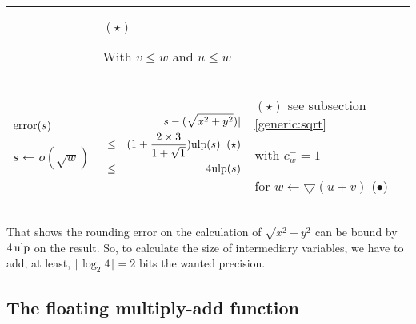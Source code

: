 \documentclass[12pt]{amsart}
\def\minf{\bigtriangledown}
\def\ulp{{\rm ulp}}
\begin{document}
\begin{center}
\begin{tabular}{l l l}
\begin{minipage}{7.8cm}
\end{minipage} &
\begin{minipage}{6cm}

$(\star)$

With $v \leq w$ and $u \leq w$

\end{minipage}\\%
\begin{minipage}{2.5cm}
${\textnormal{error}}(s)$

$s \leftarrow o(\sqrt{w}) $

\end{minipage} &
\begin{minipage}{7.5cm}

\begin{center}



\begin{eqnarray}\nonumber
  &&|s-(\sqrt{x^2+y^2})| \\\nonumber
  &\leq& (1+\frac{2 \times  3}{1+\sqrt{1}}) \ulp(s) \;\; (\star)\\\nonumber
   &\leq& 4 \ulp(s) 
\end{eqnarray}



\end{center}

\end{minipage} &
\begin{minipage}{6cm}

$(\star)$
see subsection \ref{generic:sqrt}

with $c_w^- = 1$ 

for $w \leftarrow \minf(u+v)$ ($\bullet$)

\end{minipage}


\end{tabular}
\end{center}



That shows the rounding error on the calculation of $\sqrt{x^2+y^2}$ can be
bound by $4 \, \ulp$ on the result. So, to calculate the size of
intermediary variables, we have to add, at least, $\lceil \log_2 4 \rceil=2$ bits the wanted precision.


\subsection{The floating multiply-add function}
\end{document}
